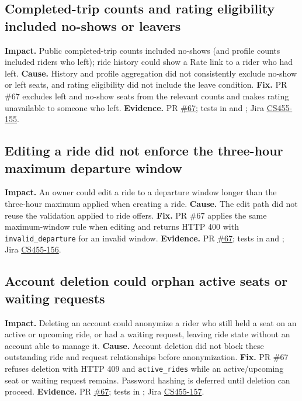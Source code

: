 \documentclass[10pt]{article}
\begin{document}
\subsection{Completed-trip counts and rating eligibility included no-shows or leavers}
\textbf{Impact.} Public completed-trip counts included no-shows (and profile counts included riders who left); ride history could show a Rate link to a rider who had left.
\textbf{Cause.} History and profile aggregation did not consistently exclude no-show or left seats, and rating eligibility did not include the leave condition.
\textbf{Fix.} PR \#67 excludes left and no-show seats from the relevant counts and makes rating unavailable to someone who left.
\textbf{Evidence.} PR \href{https://github.com/CS455-Carpooling/Campus_Ridepooling_Automation/pull/67}{\#67}; tests in  and ; Jira \href{https://cs455project.atlassian.net/browse/CS455-155}{CS455-155}.

\subsection{Editing a ride did not enforce the three-hour maximum departure window}
\textbf{Impact.} An owner could edit a ride to a departure window longer than the three-hour maximum applied when creating a ride.
\textbf{Cause.} The edit path did not reuse the validation applied to ride offers.
\textbf{Fix.} PR \#67 applies the same maximum-window rule when editing and returns HTTP 400 with \texttt{invalid\_departure} for an invalid window.
\textbf{Evidence.} PR \href{https://github.com/CS455-Carpooling/Campus_Ridepooling_Automation/pull/67}{\#67}; tests in  and ; Jira \href{https://cs455project.atlassian.net/browse/CS455-156}{CS455-156}.

\subsection{Account deletion could orphan active seats or waiting requests}
\textbf{Impact.} Deleting an account could anonymize a rider who still held a seat on an active or upcoming ride, or had a waiting request, leaving ride state without an account able to manage it.
\textbf{Cause.} Account deletion did not block these outstanding ride and request relationships before anonymization.
\textbf{Fix.} PR \#67 refuses deletion with HTTP 409 and \texttt{active\_rides} while an active/upcoming seat or waiting request remains. Password hashing is deferred until deletion can proceed.
\textbf{Evidence.} PR \href{https://github.com/CS455-Carpooling/Campus_Ridepooling_Automation/pull/67}{\#67}; tests in ; Jira \href{https://cs455project.atlassian.net/browse/CS455-157}{CS455-157}.
\end{document}

